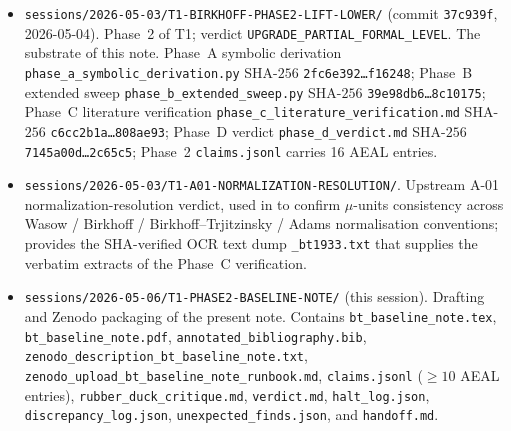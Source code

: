 \documentclass[11pt,reqno]{amsart}
\theoremstyle{plain}
\theoremstyle{definition}
\theoremstyle{remark}
\begin{document}
\begin{itemize}[leftmargin=2.2em]
\item \texttt{sessions/2026-05-03/T1-BIRKHOFF-PHASE2-LIFT-LOWER/}
  (commit \texttt{37c939f}, 2026-05-04). Phase~2 of T1; verdict
  \texttt{UPGRADE\_PARTIAL\_FORMAL\_LEVEL}. The substrate of this
  note. Phase~A symbolic derivation
  \texttt{phase\_a\_symbolic\_derivation.py} SHA-$256$
  \texttt{2fc6e392\dots f16248}; Phase~B extended sweep
  \texttt{phase\_b\_extended\_sweep.py} SHA-$256$
  \texttt{39e98db6\dots 8c10175}; Phase~C literature
  verification \texttt{phase\_c\_literature\_verification.md}
  SHA-$256$ \texttt{c6cc2b1a\dots 808ae93}; Phase~D verdict
  \texttt{phase\_d\_verdict.md} SHA-$256$
  \texttt{7145a00d\dots 2c65c5}; Phase~2 \texttt{claims.jsonl}
  carries 16 AEAL entries.
\item \texttt{sessions/2026-05-03/T1-A01-NORMALIZATION-RESOLUTION/}.
  Upstream A-01 normalization-resolution verdict, used in
   to confirm $\mu$-units consistency across
  Wasow / Birkhoff / Birkhoff--Trjitzinsky / Adams normalisation
  conventions; provides the SHA-verified
  \cite{birkhoff_trjitzinsky_1933} OCR text dump
  \texttt{\_bt1933.txt} that supplies the verbatim extracts
  of the Phase~C verification.
\item \texttt{sessions/2026-05-06/T1-PHASE2-BASELINE-NOTE/} (this
  session). Drafting and Zenodo packaging of the present note.
  Contains \texttt{bt\_baseline\_note.tex},
  \texttt{bt\_baseline\_note.pdf},
  \texttt{annotated\_bibliography.bib},
  \texttt{zenodo\_description\_bt\_baseline\_note.txt},
  \texttt{zenodo\_upload\_bt\_baseline\_note\_runbook.md},
  \texttt{claims.jsonl} ($\ge 10$ AEAL entries),
  \texttt{rubber\_duck\_critique.md}, \texttt{verdict.md},
  \texttt{halt\_log.json}, \texttt{discrepancy\_log.json},
  \texttt{unexpected\_finds.json}, and \texttt{handoff.md}.
\end{itemize}



\end{document}
